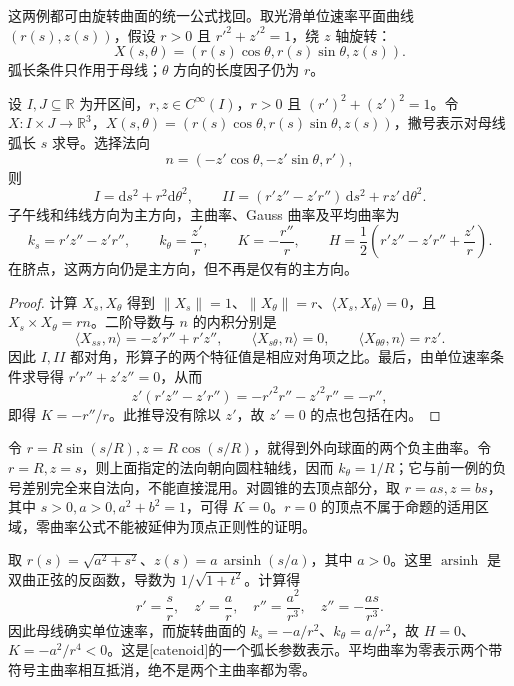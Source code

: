 这两例都可由旋转曲面的统一公式找回。取光滑单位速率平面曲线 \((r(s),z(s))\)，假设 \(r>0\) 且 \(r'^2+z'^2=1\)，绕 \(z\) 轴旋转：
\[
	X(s,\theta)=(r(s)\cos\theta,r(s)\sin\theta,z(s)).
\]
弧长条件只作用于母线；\(\theta\) 方向的长度因子仍为 \(r\)。

\begin{proposition}\label{g1:prop:revolution-two-forms}
	设 \(I,J\subseteq\mathbb R\) 为开区间，\(r,z\in C^\infty(I)\)，\(r>0\) 且 \((r')^2+(z')^2=1\)。令 \(X:I\times J\to\mathbb R^3\)，\(X(s,\theta)=(r(s)\cos\theta,r(s)\sin\theta,z(s))\)，撇号表示对母线弧长 \(s\) 求导。选择法向
	\[
		n=(-z'\cos\theta,-z'\sin\theta,r'),
	\]
	则
	\[
		I=\mathrm{d}s^2+r^2\mathrm{d}\theta^2,\qquad
		II=(r'z''-z'r'')\,\mathrm{d}s^2+rz'\,\mathrm{d}\theta^2.
	\]
	子午线和纬线方向为主方向，主曲率、Gauss 曲率及平均曲率为
	\begin{equation}\label{g1:eq:revolution-curvatures}
		k_s=r'z''-z'r'',\qquad k_\theta=\frac{z'}r,\qquad
		K=-\frac{r''}r,\qquad H=\frac12\left(r'z''-z'r''+\frac{z'}r\right).
	\end{equation}
	在脐点，这两方向仍是主方向，但不再是仅有的主方向。
\end{proposition}

\begin{proof}
	计算 \(X_s,X_\theta\) 得到 \(\|X_s\|=1\)、\(\|X_\theta\|=r\)、\(\langle X_s,X_\theta\rangle=0\)，且 \(X_s\times X_\theta=rn\)。二阶导数与 \(n\) 的内积分别是
	\[
		\langle X_{ss},n\rangle=-z'r''+r'z'',\qquad
		\langle X_{s\theta},n\rangle=0,\qquad
		\langle X_{\theta\theta},n\rangle=rz'.
	\]
	因此 \(I,II\) 都对角，形算子的两个特征值是相应对角项之比。最后，由单位速率条件求导得 \(r'r''+z'z''=0\)，从而
	\[
		z'(r'z''-z'r'')=-r'^2r''-z'^2r''=-r'',
	\]
	即得 \(K=-r''/r\)。此推导没有除以 \(z'\)，故 \(z'=0\) 的点也包括在内。
\end{proof}

令 \(r=R\sin(s/R),z=R\cos(s/R)\)，就得到外向球面的两个负主曲率。令 \(r=R,z=s\)，则上面指定的法向朝向圆柱轴线，因而 \(k_\theta=1/R\)；它与前一例的负号差别完全来自法向，不能直接混用。对圆锥的去顶点部分，取 \(r=as,z=bs\)，其中 \(s>0,a>0,a^2+b^2=1\)，可得 \(K=0\)。\(r=0\) 的顶点不属于命题的适用区域，零曲率公式不能被延伸为顶点正则性的证明。

\begin{example}\label{g1:exm:catenoid-curvatures}
	取 \(r(s)=\sqrt{a^2+s^2}\)、\(z(s)=a\,\operatorname{arsinh}(s/a)\)，其中 \(a>0\)。这里 \(\operatorname{arsinh}\) 是双曲正弦的反函数，导数为 \(1/\sqrt{1+t^2}\)。计算得
	\[
		r'=\frac{s}{r},\quad z'=\frac ar,\quad
		r''=\frac{a^2}{r^3},\quad z''=-\frac{as}{r^3}.
	\]
	因此母线确实单位速率，而旋转曲面的 \(k_s=-a/r^2\)、\(k_\theta=a/r^2\)，故 \(H=0\)、\(K=-a^2/r^4<0\)。这是[catenoid]的一个弧长参数表示。平均曲率为零表示两个带符号主曲率相互抵消，绝不是两个主曲率都为零。
\end{example}


